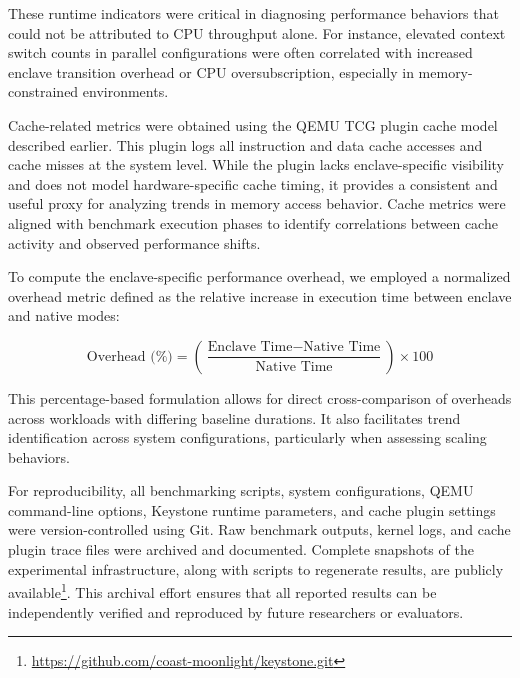 These runtime indicators were critical in diagnosing performance behaviors that could not be attributed to CPU throughput alone. For instance, elevated context switch counts in parallel configurations were often correlated with increased enclave transition overhead or CPU oversubscription, especially in memory-constrained environments.

Cache-related metrics were obtained using the QEMU TCG plugin cache model described earlier. This plugin logs all instruction and data cache accesses and cache misses at the system level. While the plugin lacks enclave-specific visibility and does not model hardware-specific cache timing, it provides a consistent and useful proxy for analyzing trends in memory access behavior. Cache metrics were aligned with benchmark execution phases to identify correlations between cache activity and observed performance shifts.

To compute the enclave-specific performance overhead, we employed a normalized overhead metric defined as the relative increase in execution time between enclave and native modes:

\[
\text{Overhead (\%)} = \left( \frac{\text{Enclave Time} - \text{Native Time}}{\text{Native Time}} \right) \times 100
\]

This percentage-based formulation allows for direct cross-comparison of overheads across workloads with differing baseline durations. It also facilitates trend identification across system configurations, particularly when assessing scaling behaviors.

For reproducibility, all benchmarking scripts, system configurations, QEMU command-line options, Keystone runtime parameters, and cache plugin settings were version-controlled using Git. Raw benchmark outputs, kernel logs, and cache plugin trace files were archived and documented. Complete snapshots of the experimental infrastructure, along with scripts to regenerate results, are publicly available\footnote{\url{https://github.com/coast-moonlight/keystone.git}}. This archival effort ensures that all reported results can be independently verified and reproduced by future researchers or evaluators.
